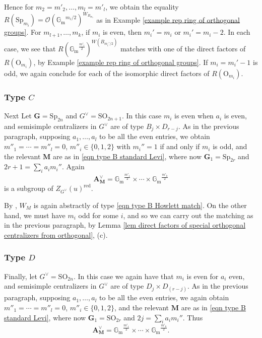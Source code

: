 \documentclass[10pt]{article}
\newcommand{\Z}{\mathbb{Z}}
\newcommand{\Oo}{\mathcal{O}}
\newcommand{\G}{\mathbf{G}}
\newcommand{\M}{\mathbf{M}}
\newcommand{\SO}{\mathrm{SO}}
\newcommand{\Sp}{\mathrm{Sp}}
\newcommand{\OO}{\mathrm{O}}
\newcommand{\Gm}{{\mathbb{G}_\mathrm{m}}}
\theoremstyle{definition}
\theoremstyle{remark}
\newcommand{\Zur}{Z_{G^\vee}(u)^{\mathrm{red}}}
\begin{document}
Hence for $m_2=m'_2,\dots, m_l=m'_l$, we obtain
the equality $R(\Sp_{m_i})=\Oo(\Gm^{m_i/2})^{W_{B_{m_i}}}$ as in Example \ref{example rep ring of orthogonal groups}.
%
For $m_{l+1},\dots, m_k$, if $m_i$ is even, then $m_i'=m_i$ or $m_i'=m_i-2$. In each case, 
we see that $R(\Gm^{\frac{m'_i}{2}})^{W(B_{m_i'/2})}$ matches with one of the direct 
factors of $R(\OO_{m_i})$, by Example \ref{example rep ring of orthogonal groups}.
If $m_i=m_i'-1$ is odd, we again conclude for each of the isomorphic direct factors 
of $R(\OO_{m_i})$.
%
\subsubsection{Type $C$}
Next Let $\G=\Sp_{2n}$ and $G^\vee=\SO_{2n+1}$.
In this case $m_i$ is even when $a_i$ is even, and semisimple centralizers in $G^\vee$ are of type
$B_{j}\times D_{r-j}$. As in the previous paragraph, supposing $a_1,\dots, a_l$ to be all the even entries, we obtain $m''_1=\cdots=m''_l=0$, $m''_i\in\{0,1,2\}$ with $m_i''=1$ if and only if $m_i$ is odd, and 
the relevant $\M$ are as in \eqref{eqn type B standard Levi},
where now $\G_1=\Sp_{2r}$ and $2r+1=\sum_ia_im_i''$. Again
%
\[
\mathbf{A}_\M^\vee=\Gm^{\frac{m'_1}{2}}\times\cdots\times\Gm^{\frac{m'_k}{2}}
\]
%
is a subgroup of $\Zur$. 

By \cite{Howlett}, $W_M$ is again abstractly of type 
\eqref{eqn type B Howlett match}. On the other hand, we must have $m_i$ odd for some $i$, and so 
we can carry out the matching as in the previous paragraph, by Lemma \ref{lem direct factors of special orthogonal centralizers from orthogonal}, (c).
%
\subsubsection{Type $D$}
Finally, let $G^\vee=\SO_{2n}$. In this 
case we again have that $m_i$ is even for $a_i$ even, and semisimple centralizers in $G^\vee$ are of type  $D_{j}\times D_{(r-j)}$. As in the previous paragraph, supposing $a_1,\dots, a_l$ to be all the even 
entries, we again obtain $m''_1=\cdots=m''_l=0$, $m''_i\in\{0,1,2\}$, and the relevant $\M$ are as in \eqref{eqn type B standard Levi}, where now $\G_1=\SO_{2r}$ and $2j=\sum_ia_im_i''$. Thus
%
\[
\mathbf{A}_\M^\vee=\Gm^{\frac{m'_1}{2}}\times\cdots\times\Gm^{\frac{m'_k}{2}}.
\]
%
\end{document}
